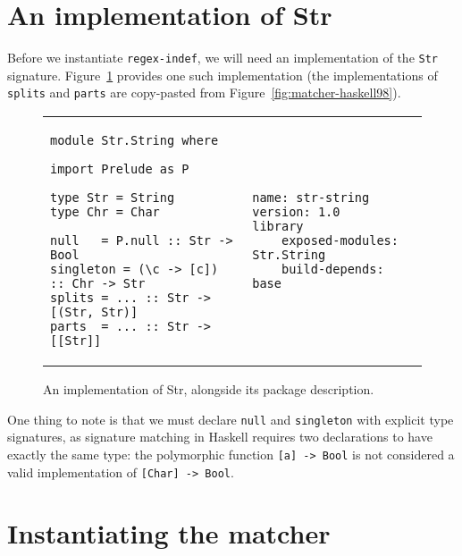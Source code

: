 \section{An implementation of Str}

Before we instantiate \verb|regex-indef|, we will need an implementation
of the \verb|Str| signature.  Figure~\ref{fig:matcher-str-string-source}
provides one such implementation (the implementations of \verb|splits| and
\verb|parts| are copy-pasted from Figure~\ref{fig:matcher-haskell98}).

\begin{figure}
\begin{tabular}{p{} p{}}
\begin{lstlisting}
module Str.String where

import Prelude as P

type Str = String
type Chr = Char

null   = P.null :: Str -> Bool
singleton = (\c -> [c]) :: Chr -> Str
splits = ... :: Str -> [(Str, Str)]
parts  = ... :: Str -> [[Str]]
\end{lstlisting}
&
\begin{lstlisting}[language=Cabal]
name: str-string
version: 1.0
library
    exposed-modules: Str.String
    build-depends: base
\end{lstlisting}
\end{tabular}
\caption{An implementation of Str, alongside its package description.}
\label{fig:matcher-str-string-source}
\end{figure}

One thing to
note is that we must declare \verb|null| and \verb|singleton| with
explicit type signatures, as signature matching in Haskell requires two
declarations to have exactly the same type: the polymorphic function
\verb|[a] -> Bool| is not considered a valid implementation of
\verb|[Char] -> Bool|. 



\section{Instantiating the matcher}

